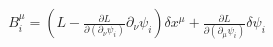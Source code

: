 \documentclass[preview]{standalone}
\begin{document}
\begin{align*}
B_i^{\mu}= \left( L- \frac{\partial L}{\partial(\partial_{\nu}\psi_i)} \partial_{\nu}\psi_i\right)\delta x^{\mu}+\frac{\partial L}{\partial(\partial_{\mu}\psi_i)}\delta \psi_i
\end{align*}
\end{document}
